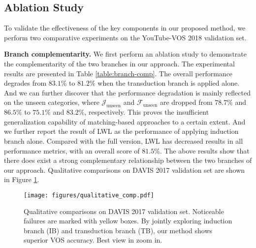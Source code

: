 \documentclass[10pt,twocolumn,letterpaper]{article}
\begin{document}
\subsection{Ablation Study}
To validate the effectiveness of the key components in our proposed method, we perform two comparative experiments on the YouTube-VOS 2018 \cite{Xu2018YouTubeVOSAL} validation set.

\noindent\textbf{Branch complementarity.}
We first perform an ablation study to demonstrate the complementarity of the two branches in our approach. The experimental results are presented in Table \ref{table:branch-comp}. The overall performance degrades from $83.1\%$ to $81.2\%$ when the transduction branch is applied alone. And we can further discover that the performance degradation is mainly reflected on the unseen categories, where $\mathcal{J}_{\text{unseen}}$ and $\mathcal{F}_{\text{unseen}}$ are dropped from $78.7 \%$ and $86.5\%$ to $75.1\%$ and $83.2\%$, respectively. This proves the insufficient generalization capability of matching-based approaches to a certain extent. And we further report the result of LWL \cite{Goutam2020A} as the performance of applying induction branch alone. Compared with the full version, LWL \cite{Goutam2020A} has decreased results in all performance metrics, with an overall score of $81.5\%$. The above results show that there does exist a strong complementary relationship between the two branches of our approach. Qualitative comparisons on DAVIS 2017 validation set are shown in Figure \ref{fig:qualitative_comp}.

\begin{figure}[htbp]
	\begin{center}
\texttt{[image: figures/qualitative\_comp.pdf]}
	\vspace{-2.0em}
	\end{center}
	\caption{Qualitative comparisons on DAVIS 2017 validation set.
		Noticeable failures are marked with yellow boxes. By jointly exploring induction branch (IB) and transduction branch (TB), our method shows superior VOS accuracy. Best view in zoom in.}
	\label{fig:qualitative_comp}
	\vspace{-1.0em}
\end{figure}
\end{document}
